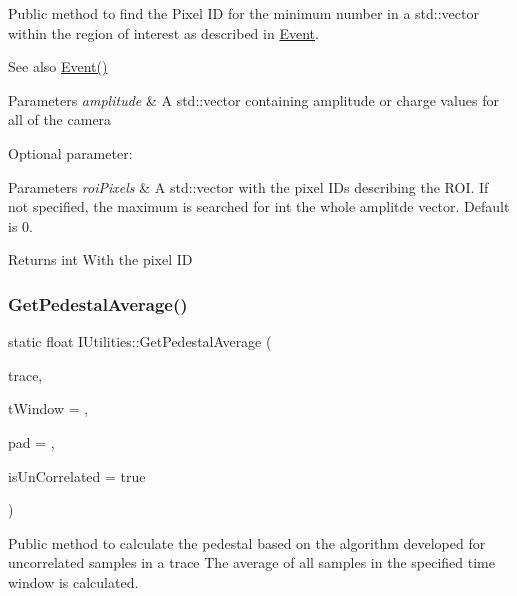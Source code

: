 Public method to find the Pixel ID for the minimum number in a std\+::vector within the region of interest as described in \hyperlink{classEvent}{Event}. 

\begin{DoxySeeAlso}{See also}
\hyperlink{classEvent}{Event()}
\end{DoxySeeAlso}

\begin{DoxyParams}{Parameters}
{\em amplitude} & A std\+::vector containing amplitude or charge values for all of the camera\\
\hline
\end{DoxyParams}
Optional parameter\+: 
\begin{DoxyParams}{Parameters}
{\em roi\+Pixels} & A std\+::vector with the pixel I\+Ds describing the R\+OI. If not specified, the maximum is searched for int the whole amplitde vector. Default is 0.\\
\hline
\end{DoxyParams}
\begin{DoxyReturn}{Returns}
int With the pixel ID 
\end{DoxyReturn}
\mbox{\label{classIUtilities_a65527a73c39d6cae81f6a09fb9a44d93}} 
\subsubsection{\texorpdfstring{Get\+Pedestal\+Average()}{GetPedestalAverage()}}
{\footnotesize\ttfamily static float I\+Utilities\+::\+Get\+Pedestal\+Average (\begin{DoxyParamCaption}\item[{std\+::vector$<$ int $>$}]{trace,  }\item[{int}]{t\+Window = {},  }\item[{int}]{pad = {},  }\item[{bool}]{is\+Un\+Correlated = {\ttfamily true} }\end{DoxyParamCaption})\hspace{0.3cm}{\ttfamily [static]}}



Public method to calculate the pedestal based on the algorithm developed for uncorrelated samples in a trace The average of all samples in the specified time window is calculated. 

